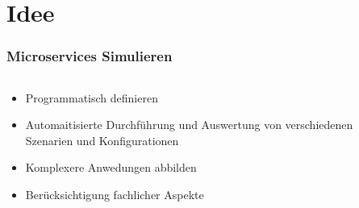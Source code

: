 \section{Idee}

\begin{frame}
    \frametitle{Microservices Simulieren}

    \begin{columns}
        
        \begin{column}{0.5\textwidth}
            \begin{itemize}
                \item Programmatisch definieren
                \item Automaitisierte Durchführung und Auswertung von verschiedenen Szenarien und Konfigurationen
                \item Komplexere Anwedungen abbilden
                \item Berücksichtigung fachlicher Aspekte
            \end{itemize}
        \end{column}

        \begin{column}{0.5\textwidth}
            \inputminted{csharp}{code/Einleitung.cs}
        \end{column}

    \end{columns}
\end{frame}


